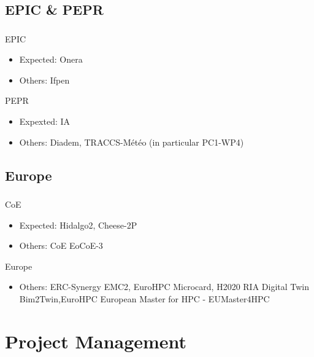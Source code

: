 \subsection{EPIC \& PEPR}
\begin{frame}
  \frametitle{\insertsectionhead}
  \framesubtitle{\insertsubsectionhead}
\begin{alertblock}{EPIC}
  \begin{itemize}
    \item Expected: Onera
    \item Others: Ifpen
  \end{itemize}
\end{alertblock}

\begin{alertblock}{PEPR}
  \begin{itemize}
    \item Expexted: IA
    \item Others: Diadem, TRACCS-Météo (in particular PC1-WP4)
  \end{itemize}
\end{alertblock}

\end{frame}

\subsection{Europe}
\begin{frame}
  \frametitle{\insertsectionhead}
  \framesubtitle{\insertsubsectionhead}
  \begin{alertblock}{CoE}
    \begin{itemize}
      \item Expected: Hidalgo2, Cheese-2P
      \item Others: CoE	EoCoE-3
    \end{itemize}
  \end{alertblock}

  \begin{alertblock}{Europe}
    \begin{itemize}
      \item Others: ERC-Synergy	EMC2, EuroHPC	Microcard, H2020 RIA Digital Twin	Bim2Twin,EuroHPC	European Master for HPC - EUMaster4HPC	
    \end{itemize}
  \end{alertblock}
\end{frame}

\section{Project Management}

